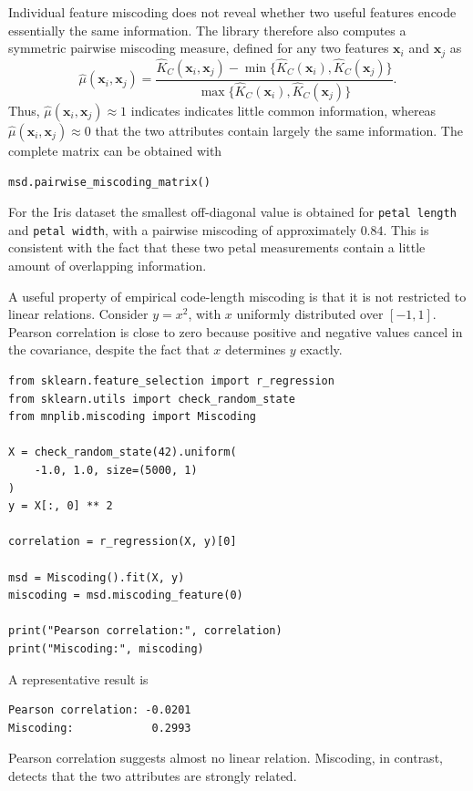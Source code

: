 Individual feature miscoding does not reveal whether two useful features encode essentially the same information. The library therefore also computes a symmetric pairwise miscoding measure, defined for any two features $\mathbf{x}_i$ and $\mathbf{x}_j$ as
\[
\hat\mu(\mathbf{x}_i,\mathbf{x}_j) = \frac{ \hat K_C(\mathbf{x}_i,\mathbf{x}_j)
- \min\{\hat K_C(\mathbf{x}_i), \hat K_C(\mathbf{x}_j) \} }{
\max\{\hat K_C(\mathbf{x}_i), \hat K_C(\mathbf{x}_j)\}}.
\]
Thus, $\hat\mu(\mathbf{x}_i,\mathbf{x}_j) \approx 1$ indicates indicates little common information, whereas $\hat\mu(\mathbf{x}_i,\mathbf{x}_j) \approx 0$ that the two attributes contain largely the same information. The complete matrix can be obtained with

\begin{sourcecode}
{\scriptsize \begin{verbatim}
msd.pairwise_miscoding_matrix()
\end{verbatim}}
\end{sourcecode}

For the Iris dataset the smallest off-diagonal value is obtained for \texttt{petal length} and \texttt{petal width}, with a pairwise miscoding of approximately $0.84$. This is consistent with the fact that these two petal measurements contain a little amount of overlapping information.

\begin{example}

A useful property of empirical code-length miscoding is that it is not restricted to linear relations. Consider $y=x^2$,  with $x$ uniformly distributed over $[-1,1]$. Pearson correlation is close to zero because positive and negative values cancel in the covariance, despite the fact that $x$ determines $y$ exactly.

\begin{sourcecode}
{\scriptsize \begin{verbatim}
from sklearn.feature_selection import r_regression
from sklearn.utils import check_random_state
from mnplib.miscoding import Miscoding

X = check_random_state(42).uniform(
    -1.0, 1.0, size=(5000, 1)
)
y = X[:, 0] ** 2

correlation = r_regression(X, y)[0]

msd = Miscoding().fit(X, y)
miscoding = msd.miscoding_feature(0)

print("Pearson correlation:", correlation)
print("Miscoding:", miscoding)
\end{verbatim}}
\end{sourcecode}

A representative result is

\begin{sourcecode}
{\scriptsize \begin{verbatim}
Pearson correlation: -0.0201
Miscoding:            0.2993
\end{verbatim}}
\end{sourcecode}

Pearson correlation suggests almost no linear relation. Miscoding, in contrast, detects that the two attributes are strongly related.
\end{example}

